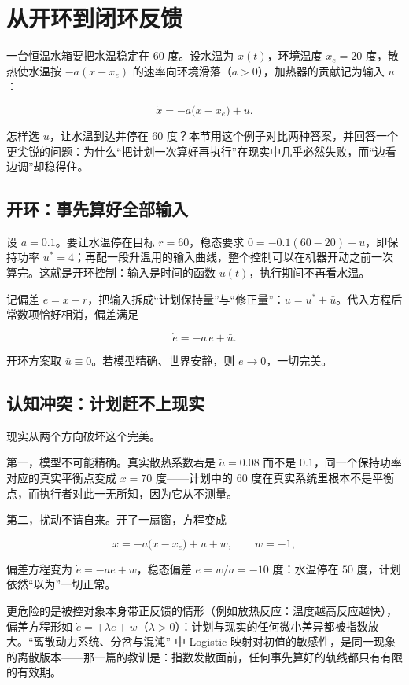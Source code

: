 \section{从开环到闭环反馈}

一台恒温水箱要把水温稳定在 \(60\) 度。设水温为 \(x(t)\)，环境温度 \(x_e=20\) 度，散热使水温按 \(-a(x-x_e)\) 的速率向环境滑落（\(a>0\)），加热器的贡献记为输入 \(u\)：

\[
\dot x=-a\bigl(x-x_e\bigr)+u.
\]

怎样选 \(u\)，让水温到达并停在 \(60\) 度？本节用这个例子对比两种答案，并回答一个更尖锐的问题：为什么``把计划一次算好再执行''在现实中几乎必然失败，而``边看边调''却稳得住。

\subsection{开环：事先算好全部输入}

设 \(a=0.1\)。要让水温停在目标 \(r=60\)，稳态要求 \(0=-0.1(60-20)+u\)，即保持功率 \(u^\ast=4\)；再配一段升温用的输入曲线，整个控制可以在机器开动之前一次算完。这就是开环控制：输入是时间的函数 \(u(t)\)，执行期间不再看水温。

记偏差 \(e=x-r\)，把输入拆成``计划保持量''与``修正量''：\(u=u^\ast+\bar u\)。代入方程后常数项恰好相消，偏差满足

\[
\dot e=-a\,e+\bar u.
\]

开环方案取 \(\bar u\equiv0\)。若模型精确、世界安静，则 \(e\to0\)，一切完美。

\subsection{认知冲突：计划赶不上现实}

现实从两个方向破坏这个完美。

第一，模型不可能精确。真实散热系数若是 \(\tilde a=0.08\) 而不是 \(0.1\)，同一个保持功率对应的真实平衡点变成 \(x=70\) 度——计划中的 \(60\) 度在真实系统里根本不是平衡点，而执行者对此一无所知，因为它从不测量。

第二，扰动不请自来。开了一扇窗，方程变成

\[
\dot x=-a\bigl(x-x_e\bigr)+u+w,\qquad w=-1,
\]

偏差方程变为 \(\dot e=-ae+w\)，稳态偏差 \(e=w/a=-10\) 度：水温停在 \(50\) 度，计划依然``以为''一切正常。

更危险的是被控对象本身带正反馈的情形（例如放热反应：温度越高反应越快），偏差方程形如 \(\dot e=+\lambda e+w\)（\(\lambda>0\)）：计划与现实的任何微小差异都被指数放大。``离散动力系统、分岔与混沌'' 中 Logistic 映射对初值的敏感性，是同一现象的离散版本——那一篇的教训是：指数发散面前，任何事先算好的轨线都只有有限的有效期。

